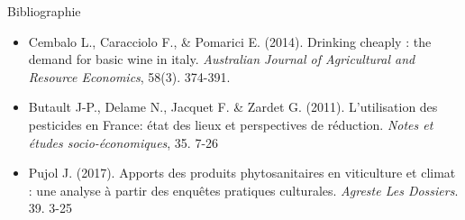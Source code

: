 \documentclass[11pt,ignorenonframetext,]{beamer}
\providecommand{\tightlist}{%
  \setlength{\itemsep}{0pt}\setlength{\parskip}{0pt}}
\begin{document}
\begin{frame}{Bibliographie}
\protect\hypertarget{bibliographie}{}

\begin{itemize}
\tightlist
\item
  Cembalo L., Caracciolo F., \& Pomarici E. (2014). Drinking cheaply :
  the demand for basic wine in italy. \emph{Australian Journal of
  Agricultural and Resource Economics}, 58(3). 374-391.
\item
  Butault J-P., Delame N., Jacquet F. \& Zardet G. (2011). L'utilisation
  des pesticides en France: état des lieux et perspectives de réduction.
  \emph{Notes et études socio-économiques}, 35. 7-26
\item
  Pujol J. (2017). Apports des produits phytosanitaires en viticulture
  et climat : une analyse à partir des enquêtes pratiques culturales.
  \emph{Agreste Les Dossiers}. 39. 3-25
\end{itemize}

\end{frame}
\end{document}
